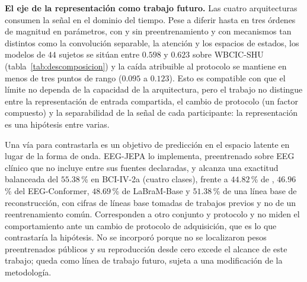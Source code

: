 \textbf{El eje de la representación como trabajo futuro.} Las cuatro arquitecturas consumen la señal en el
dominio del tiempo. Pese a diferir hasta en tres órdenes de magnitud en parámetros, con y sin preentrenamiento y
con mecanismos tan distintos como la convolución separable, la atención y los espacios de estados, los modelos de
$44$ sujetos se sitúan entre $0.598$ y $0.623$ sobre WBCIC-SHU (tabla~\ref{tab:descomposicion}) y la caída
atribuible al protocolo se mantiene en menos de tres puntos de rango ($0.095$ a $0.123$). Esto es compatible
con que el límite no dependa de la capacidad de la arquitectura, pero el trabajo no distingue entre la
representación de entrada compartida, el cambio de protocolo (un factor compuesto) y la separabilidad de la
señal de cada participante: la representación es una hipótesis entre varias.

Una vía para contrastarla es un objetivo de predicción en el espacio latente en lugar de la forma de onda.
EEG-JEPA \cite{li2026eegjepa} lo implementa, preentrenado sobre EEG clínico que no incluye \openbmi{} entre sus
fuentes declaradas, y alcanza una exactitud balanceada del $55.38$\,\% en BCI-IV-2a (cuatro clases), frente a
$44.82$\,\% de \eegnet{}, $46.96$\,\% del EEG-Conformer, $48.69$\,\% de LaBraM-Base y $51.38$\,\% de una línea
base de reconstrucción, con cifras de líneas base tomadas de trabajos previos y no de un reentrenamiento común.
Corresponden a otro conjunto y protocolo y no miden el comportamiento ante un cambio de protocolo de
adquisición, que es lo que contrastaría la hipótesis. No se incorporó porque no se localizaron pesos
preentrenados públicos y su reproducción desde cero excede el alcance de este trabajo; queda como línea de
trabajo futuro, sujeta a una modificación de la metodología.

\appendix


